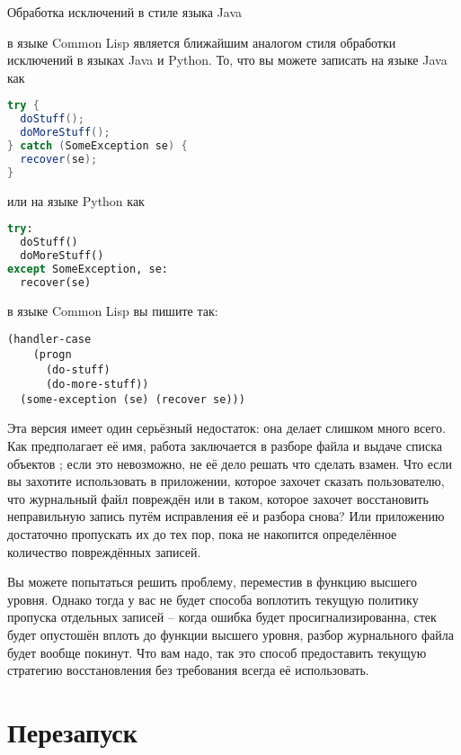  Обработка исключений в стиле языка Java 

 в языке Common Lisp является ближайшим аналогом стиля обработки
исключений в языках Java и Python. То, что вы можете записать на языке Java как 

\begin{lstlisting}[language=Java]
try {
  doStuff();
  doMoreStuff();
} catch (SomeException se) {
  recover(se);
}
\end{lstlisting} 

или на языке Python как 

\begin{lstlisting}[language=Python]
try:
  doStuff()
  doMoreStuff()
except SomeException, se:
  recover(se)
\end{lstlisting} 

в языке Common Lisp вы пишите так: 

\begin{lstlisting}
(handler-case
    (progn
      (do-stuff)
      (do-more-stuff))
  (some-exception (se) (recover se)))
\end{lstlisting} 


Эта версия  имеет один серьёзный недостаток: она делает слишком много
всего. Как предполагает её имя, работа  заключается в разборе файла и
выдаче списка объектов ; если это невозможно, не её дело решать что
сделать взамен. Что если вы захотите использовать  в приложении,
которое захочет сказать пользователю, что журнальный файл повреждён или в таком, которое
захочет восстановить неправильную запись путём исправления её и разбора снова? Или
приложению достаточно пропускать их до тех пор, пока не накопится определённое количество
повреждённых записей.

Вы можете попытаться решить проблему, переместив  в функцию высшего
уровня. Однако тогда у вас не будет способа воплотить текущую политику пропуска отдельных
записей -- когда ошибка будет просигнализированна, стек будет опустошён вплоть до функции
высшего уровня, разбор журнального файла будет вообще покинут. Что вам надо, так это
способ предоставить текущую стратегию восстановления без требования всегда её
использовать.

\section{Перезапуск}

